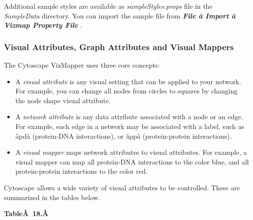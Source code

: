  Additional sample styles are available as \emph{sampleStyles.props}
 file in the \emph{SampleData}
 directory. You can import the sample file from \emph{\textbf{File \^a Import \^a Vizmap Property File}
}
. 


 
\subsubsection*{Visual Attributes, Graph Attributes and Visual Mappers}


 The Cytoscape VizMapper uses three core concepts: 
\begin{itemize}
\item 

 A \emph{visual attribute}
 is any visual setting that can be applied to your network. For example, you can change all nodes from circles to squares by changing the node shape visual attribute. 

\item 

 A \emph{network attribute}
 is any data attribute associated with a node or an edge. For example, each edge in a network may be associated with a label, such as \^apd\^a (protein-DNA interactions), or \^app\^a (protein-protein interactions). 

\item 

 A \emph{visual mapper}
 maps network attributes to visual attributes. For example, a visual mapper can map all protein-DNA interactions to the color blue, and all protein-protein interactions to the color red. 


\end{itemize}


 Cytoscape allows a wide variety of visual attributes to be controlled. These are summarized in the tables below. 


 \textbf{Table\^A 18.\^A }



